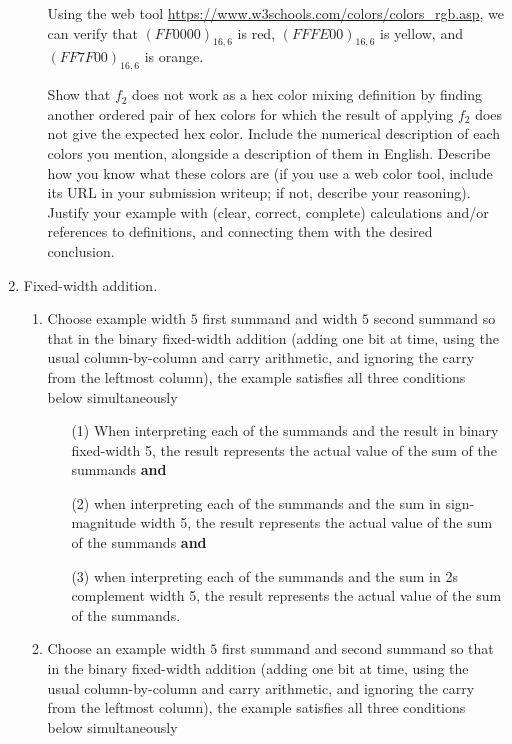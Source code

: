 \documentclass[12pt, oneside]{article}
\begin{document}
\begin{enumerate}[labelindent=0pt, leftmargin=0pt]
\begin{enumerate}
Using the web tool \url{https://www.w3schools.com/colors/colors_rgb.asp}, we can verify that $(FF0000)_{16,6}$ is red, 
$(FFFE00)_{16,6}$ is yellow, and $(FF7F00)_{16,6}$ is orange.

Show that $f_2$ does not work as a hex color mixing definition by finding
another ordered pair of hex colors for which the result of applying $f_2$ does not give the expected hex color.
Include the numerical description of each colors you mention, alongside a description of them in English. 
Describe how you know what these colors are
(if you use a web color tool, include its URL in your submission writeup; if not, describe your reasoning).
Justify your 
example with (clear, correct, complete) calculations and/or references to definitions, and connecting them with
the desired conclusion.
\end{enumerate}
        \item Fixed-width addition.  
        \begin{enumerate}
            \item Choose example width $5$ first summand and width $5$ second summand so that 
            in the  binary fixed-width addition (adding one bit at time, using 
            the usual column-by-column and carry arithmetic, and ignoring the carry 
            from the  leftmost column), the example satisfies all three conditions below simultaneously
            \begin{itemize}
            \item[(1)] When interpreting each of the summands and the result in binary fixed-width 5, 
            the result represents the actual value of the sum of the summands {\bf and}
            \item[(2)] when interpreting each of the summands and the sum in sign-magnitude width 5, the result  
            represents the actual value of the sum of the summands {\bf and}
            \item[(3)] when interpreting each of the summands and the sum in 2s complement width 5, the result 
            represents the actual value of the sum of the summands.
            \end{itemize}
            \item Choose an example width $5$ first summand and second summand so that 
            in the binary fixed-width addition (adding one bit at time, using 
            the usual column-by-column and carry arithmetic, and ignoring the carry 
            from the  leftmost column),  the example satisfies all three conditions below simultaneously

\end{enumerate}
\end{enumerate}
\end{document}

